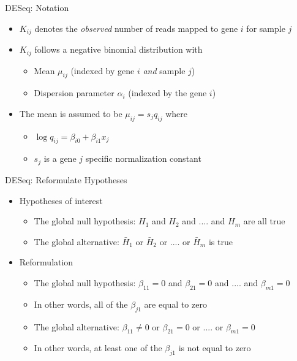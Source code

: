 \documentclass[xcolor=x11names,compress]{beamer}\usepackage[]{graphicx}\usepackage[]{color}
\begin{document}


\begin{frame}{DESeq: Notation}
  \begin{itemize}
  \item $K_{ij}$ denotes the {\it observed} number of reads mapped to gene $i$ for sample $j$
  \item $K_{ij}$ follows a negative binomial distribution with
    \begin{itemize}
    \item Mean $\mu_{ij}$ (indexed by gene $i$ {\it and} sample $j$)
    \item Dispersion parameter $\alpha_i$ (indexed by the gene $i$)
    \end{itemize}
  \item The mean is assumed to be $\mu_{ij}=s_{j} q_{ij}$
    where
    \begin{itemize}
    \item  $\log q_{ij} = \beta_{i0} + \beta_{i1} x_j$
    \item  $s_j$ is a gene $j$ specific normalization constant
  \end{itemize}
    \end{itemize}
\end{frame}


\begin{frame}{DESeq: Reformulate Hypotheses}
  \begin{itemize}
    \item Hypotheses of interest
       \begin{itemize}
   \item The global null hypothesis: $H_1$ and $H_2$ and .... and $H_m$ are all true
  \item The global alternative: $\bar{H}_1$ or $\bar{H}_2$ or .... or $\bar{H}_m$ is true
    \end{itemize}
   \item Reformulation
     \begin{itemize}
     \item The global null hypothesis: $\beta_{11}=0$ and $\beta_{21}=0$ and .... and $\beta_{m1}=0$
      \item In other words, all of the $\beta_{j1}$ are equal to zero
       \item The global alternative: $\beta_{11} \ne 0$ or $\beta_{21}=0$ or .... or $\beta_{m1}=0$
       \item In other words, at least one of the $\beta_{j1}$ is not equal to zero
     \end{itemize}
    
    \end{itemize}
\end{frame}
\end{document}
